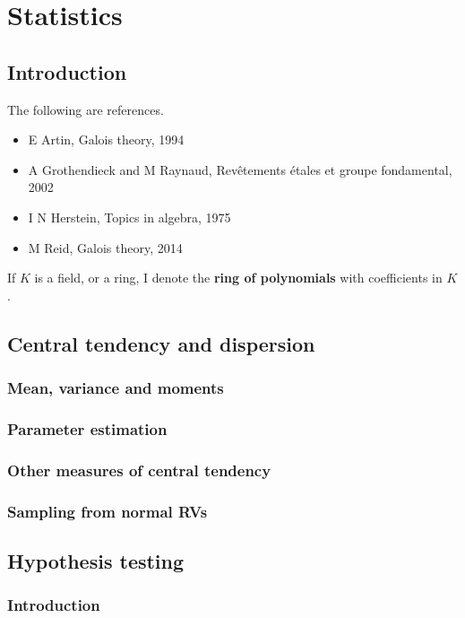 \documentclass[../Year1/Year1.tex]{subfiles}
\begin{document}
\chapter{Statistics}
\renewcommand*\thesection{\arabic{section}}

\section{Introduction}


The following are references.
\begin{itemize}
\item E Artin, Galois theory, 1994
\item A Grothendieck and M Raynaud, Rev\^etements \'etales et groupe fondamental, 2002
\item I N Herstein, Topics in algebra, 1975
\item M Reid, Galois theory, 2014
\end{itemize}

\begin{notation*}
If $ K $ is a field, or a ring, I denote
the \textbf{ring of polynomials} with coefficients in $ K $.
\end{notation*}

\section{Central tendency and dispersion}
\subsection{Mean, variance and moments}
\subsection{Parameter estimation}
\subsection{Other measures of central tendency}
\subsection{Sampling from normal RVs}
\section{Hypothesis testing}
\subsection{Introduction}
\end{document}
